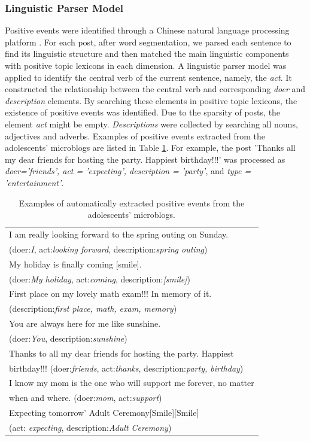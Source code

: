 \subsubsection{Linguistic Parser Model}
Positive events were identified through a Chinese natural language processing platform \citep{Che2010}.
For each post, after word segmentation, we parsed each sentence to find its linguistic structure
and then matched the main linguistic components with positive topic lexicons in each dimension.
A linguistic parser model was applied to identify the central verb of the current sentence, namely, the \emph{act}.
It constructed the relationship between the central verb and corresponding \emph{doer} and \emph{description} elements.
By searching these elements in positive topic lexicons,
the existence of positive events was identified.
Due to the sparsity of posts, the element \emph{act} might be empty.
\emph{Descriptions} were collected by searching all nouns, adjectives and adverbs.
Examples of positive events extracted from the adolescents' microblogs are listed in Table \ref{tab:uplifts}.
For example, the post 'Thanks all my dear friends for hosting the party. Happiest birthday!!!'
was processed as \emph{doer='friends', act = 'expecting', description = 'party'},
and \emph{type = 'entertainment'}. 

\begin{table}[h]
\begin{center}
\caption{\small{Examples of automatically extracted positive events from the adolescents' microblogs.}}
\small{
\begin{tabular}{|l|} \hline
I am really looking forward to the spring outing on Sunday. \\
(doer:\emph{I}, act:\emph{looking forward}, description:\emph{spring outing})\\\hline
My holiday is finally coming [smile]. \\
(doer:\emph{My holiday}, act:\emph{coming}, description:\emph{[smile]})\\\hline
First place on my lovely math exam!!! In memory of it.\\
(description:\emph{first place, math, exam, memory})\\\hline
You are always here for me like sunshine. \\
(doer:\emph{You}, description:\emph{sunshine})\\\hline
Thanks to all my dear friends for hosting the party. Happiest\\
birthday!!! (doer:\emph{friends}, act:\emph{thanks}, description:\emph{party, birthday})\\\hline
I know my mom is the one who will support me forever, no matter \\
when and where. (doer:\emph{mom}, act:\emph{support})\\ \hline
Expecting tomorrow' Adult Ceremony[Smile][Smile]~~\\
(act: \emph{expecting}, description:\emph{Adult Ceremony})\\\hline
\end{tabular}}
\label{tab:uplifts}
\end{center}
\end{table}

